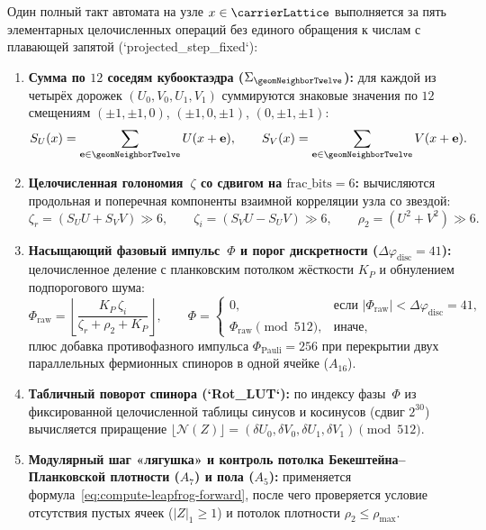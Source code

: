 Один полный такт автомата на узле $x\in\carrierLattice$ выполняется за пять элементарных целочисленных операций без единого обращения к числам с плавающей запятой (`projected\_step\_fixed`):
\begin{enumerate}[leftmargin=*]
\item \textbf{Сумма по $12$ соседям кубооктаэдра ($\Sigma_{\geomNeighborTwelve}$):}
  для каждой из четырёх дорожек $(U_0, V_0, U_1, V_1)$ суммируются знаковые значения по $12$ смещениям $(\pm 1, \pm 1, 0)$, $(\pm 1, 0, \pm 1)$, $(0, \pm 1, \pm 1)$:
  \[
    S_U(x) = \sum_{\mathbf{e}\in\geomNeighborTwelve} U(x + \mathbf{e}),
    \qquad
    S_V(x) = \sum_{\mathbf{e}\in\geomNeighborTwelve} V(x + \mathbf{e}).
  \]
\item \textbf{Целочисленная голономия~$\zeta$ со сдвигом на $\mathrm{frac\_bits} = 6$:}
  вычисляются продольная и поперечная компоненты взаимной корреляции узла со звездой:
  \[
    \zeta_r = (S_U U + S_V V) \gg 6,
    \qquad
    \zeta_i = (S_V U - S_U V) \gg 6,
    \qquad
    \rho_2 = (U^2 + V^2) \gg 6.
  \]
\item \textbf{Насыщающий фазовый импульс~$\Phi$ и порог дискретности ($\Delta\varphi_{\mathrm{disc}} = 41$):}
  целочисленное деление с планковским потолком жёсткости $K_P$ и обнулением подпорогового шума:
  \[
    \Phi_{\mathrm{raw}} = \left\lfloor\frac{K_P\,\zeta_i}{\zeta_r + \rho_2 + K_P}\right\rfloor,
    \qquad
    \Phi = \begin{cases}
      0, & \text{если } |\Phi_{\mathrm{raw}}| < \Delta\varphi_{\mathrm{disc}} = 41,\\
      \Phi_{\mathrm{raw}} \pmod{512}, & \text{иначе,}
    \end{cases}
  \]
  плюс добавка противофазного импульса $\Phi_{\mathrm{Pauli}} = 256$ при перекрытии двух параллельных фермионных спиноров в одной ячейке ($A_{16}$).
\item \textbf{Табличный поворот спинора (`Rot\_LUT`):}
  по индексу фазы~$\Phi$ из фиксированной целочисленной таблицы синусов и косинусов (сдвиг $2^{30}$) вычисляется приращение $\lfloor\mathcal{N}(Z)\rfloor = (\delta U_0, \delta V_0, \delta U_1, \delta V_1) \pmod{512}$.
\item \textbf{Модулярный шаг «лягушка» и контроль потолка Бекештейна--Планковской плотности ($A_7$) и пола ($A_5$):}
  применяется формула~\eqref{eq:compute-leapfrog-forward}, после чего проверяется условие отсутствия пустых ячеек ($|Z|_1 \ge 1$) и потолок плотности $\rho_2 \le \rho_{\max}$.
\end{enumerate}

